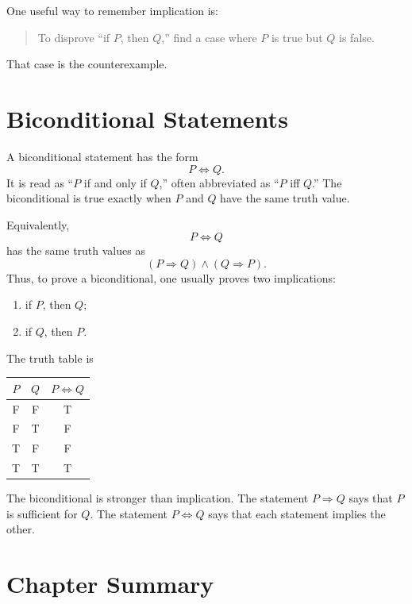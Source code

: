 One useful way to remember implication is:
\begin{quote}
To disprove ``if \(P\), then \(Q\),'' find a case where \(P\) is true but \(Q\) is false.
\end{quote}
That case is the counterexample.

\section{Biconditional Statements}
\label{mf:logic-biconditional}

A biconditional statement has the form
\[
P \Leftrightarrow Q.
\]
It is read as ``\(P\) if and only if \(Q\),'' often abbreviated as ``\(P\) iff \(Q\).'' The biconditional is true exactly when \(P\) and \(Q\) have the same truth value.

Equivalently,
\[
P \Leftrightarrow Q
\]
has the same truth values as
\[
(P \Rightarrow Q) \land (Q \Rightarrow P).
\]
Thus, to prove a biconditional, one usually proves two implications:
\begin{enumerate}
    \item if \(P\), then \(Q\);
    \item if \(Q\), then \(P\).
\end{enumerate}

The truth table is
\begin{center}
\begin{tabular}{c c c}
\hline
\(P\) & \(Q\) & \(P \Leftrightarrow Q\) \\
\hline
F & F & T \\
F & T & F \\
T & F & F \\
T & T & T \\
\hline
\end{tabular}
\end{center}
The biconditional is stronger than implication. The statement \(P \Rightarrow Q\) says that \(P\) is sufficient for \(Q\). The statement \(P \Leftrightarrow Q\) says that each statement implies the other.

\section{Chapter Summary}
\label{mf:logic-summary}

